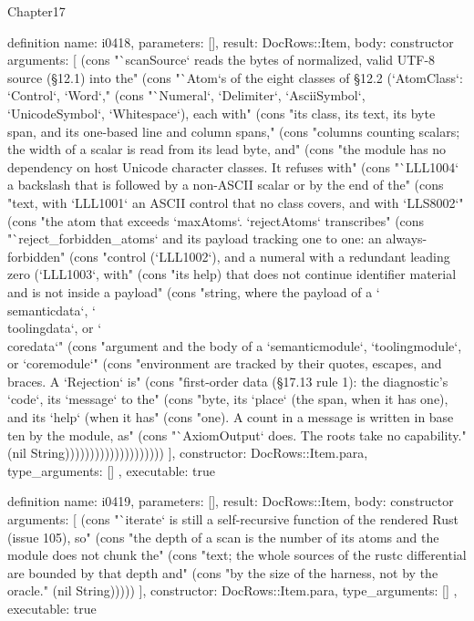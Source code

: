 \begin{lexlean}{Chapter17}
\begin{semanticmodule}
definition{
  name: i0418,
  parameters: [],
  result: DocRows::Item,
  body: constructor{
    arguments: [
      (cons "`scanSource` reads the bytes of normalized, valid UTF-8 source (§12.1) into the" (cons "`Atom`s of the eight classes of §12.2 (`AtomClass`: `Control`, `Word`," (cons "`Numeral`, `Delimiter`, `AsciiSymbol`, `UnicodeSymbol`, `Whitespace`), each with" (cons "its class, its text, its byte span, and its one-based line and column spans," (cons "columns counting scalars; the width of a scalar is read from its lead byte, and" (cons "the module has no dependency on host Unicode character classes. It refuses with" (cons "`LLL1004` a backslash that is followed by a non-ASCII scalar or by the end of the" (cons "text, with `LLL1001` an ASCII control that no class covers, and with `LLS8002`" (cons "the atom that exceeds `maxAtoms`. `rejectAtoms` transcribes" (cons "`reject_forbidden_atoms` and its payload tracking one to one: an always-forbidden" (cons "control (`LLL1002`), and a numeral with a redundant leading zero (`LLL1003`, with" (cons "its help) that does not continue identifier material and is not inside a payload" (cons "string, where the payload of a `\\semanticdata`, `\\toolingdata`, or `\\coredata`" (cons "argument and the body of a `semanticmodule`, `toolingmodule`, or `coremodule`" (cons "environment are tracked by their quotes, escapes, and braces. A `Rejection` is" (cons "first-order data (§17.13 rule 1): the diagnostic's `code`, its `message` to the" (cons "byte, its `place` (the span, when it has one), and its `help` (when it has" (cons "one). A count in a message is written in base ten by the module, as" (cons "`AxiomOutput` does. The roots take no capability." (nil String))))))))))))))))))))
    ],
    constructor: DocRows::Item.para,
    type_arguments: []
  },
  executable: true
}

definition{
  name: i0419,
  parameters: [],
  result: DocRows::Item,
  body: constructor{
    arguments: [
      (cons "`iterate` is still a self-recursive function of the rendered Rust (issue 105), so" (cons "the depth of a scan is the number of its atoms and the module does not chunk the" (cons "text; the whole sources of the rustc differential are bounded by that depth and" (cons "by the size of the harness, not by the oracle." (nil String)))))
    ],
    constructor: DocRows::Item.para,
    type_arguments: []
  },
  executable: true
}


\end{semanticmodule}
\end{lexlean}

